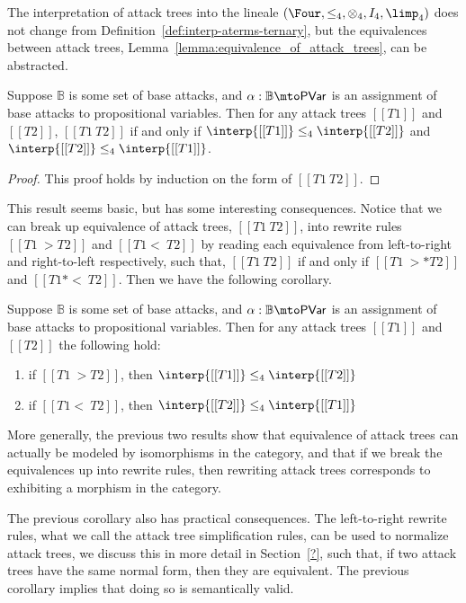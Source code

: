 The interpretation of attack trees into the lineale $(\Four, \leq_4,
\otimes_4, I_4, \limp_4)$ does not change from
Definition~\ref{def:interp-aterms-ternary}, but the equivalences
between attack trees, Lemma~\ref{lemma:equivalence_of_attack_trees},
can be abstracted.
\begin{lemma}
  \label{lemma:equivalence_of_attack_trees_lineale}
  Suppose $\mathbb{B}$ is some set of base attacks, and $\alpha :
  \mathbb{B} \mto \mathsf{PVar}$ is an assignment of base attacks to
  propositional variables.  Then for any attack trees $[[T1]]$ and
  $[[T2]]$, $[[T1 ~ T2]]$ if and only if $\interp{[[T1]]} \leq_4 \interp{[[T2]]}$ and
  $\interp{[[T2]]} \leq_4 \interp{[[T1]]}$.
\end{lemma}
\begin{proof}
  This proof holds by induction on the form of $[[T1 ~ T2]]$.
\end{proof}
This result seems basic, but has some interesting consequences.
Notice that we can break up equivalence of attack trees, $[[T1 ~
    T2]]$, into rewrite rules $[[T1 ~> T2]]$ and $[[T1 <~ T2]]$ by
reading each equivalence from left-to-right and right-to-left
respectively, such that, $[[T1 ~ T2]]$ if and only if $[[T1 ~>* T2]]$
and $[[T1 *<~ T2]]$.  Then we have the following corollary.
\begin{corollary}
  \label{corollary:attack_trees_rewrites_mor_lineale}
  Suppose $\mathbb{B}$ is some set of base attacks, and $\alpha :
  \mathbb{B} \mto \mathsf{PVar}$ is an assignment of base attacks to
  propositional variables.  Then for any attack trees $[[T1]]$ and
  $[[T2]]$ the following hold:
  \begin{enumerate}[label=\roman*.]
  \item if $[[T1 ~> T2]]$, then $\interp{[[T1]]} \leq_4 \interp{[[T2]]}$
  \item if $[[T1 <~ T2]]$, then $\interp{[[T2]]} \leq_4 \interp{[[T1]]}$
  \end{enumerate}
\end{corollary}
More generally, the previous two results show that equivalence of
attack trees can actually be modeled by isomorphisms in the category,
and that if we break the equivalences up into rewrite rules, then
rewriting attack trees corresponds to exhibiting a morphism in the
category.

The previous corollary also has practical consequences. The
left-to-right rewrite rules, what we call the attack tree
simplification rules, can be used to normalize attack trees, we
discuss this in more detail in Section~\ref{?}, such that, if two
attack trees have the same normal form, then they are equivalent.  The
previous corollary implies that doing so is semantically valid.

